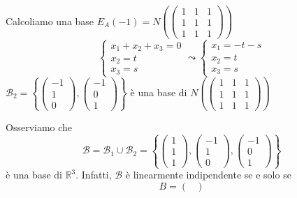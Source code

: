 \documentclass[a4paper]{article}
\theoremstyle{break}
\theoremstyle{break}
\theoremstyle{break}
\theoremstyle{break}
\begin{document}
\begin{example}
\begin{enumerate}
      \vspace{1em}
      \noindent Calcoliamo una base \( E_A(-1) = N \left( \begin{pmatrix} 
        1 & 1 & 1\\
        1 & 1 & 1\\
        1 & 1 & 1
      \end{pmatrix}  \right)  \) 
      \[
      \begin{cases}
        x_1 + x_2 + x_3 = 0\\
        x_2 = t\\
        x_3 = s
      \end{cases}
      \leadsto
      \begin{cases}
        x_1 = -t - s\\
        x_2 = t\\
        x_3 = s
      \end{cases}
      \] 
      \( \mathcal{B}_2 = \left\{ \begin{pmatrix} -1\\1\\0 \end{pmatrix},
      \begin{pmatrix} -1\\0\\1 \end{pmatrix}  \right\}  \) è una base di
      \( N \left( \begin{pmatrix} 
        1 & 1 & 1\\
        1 & 1 & 1\\
        1 & 1 & 1
      \end{pmatrix}  \right)  \)
  \end{enumerate}
  Osserviamo che \[ \mathcal{B} = \mathcal{B}_1 \cup \mathcal{B}_2 = 
    \left\{ \begin{pmatrix} 1\\1\\1 \end{pmatrix},
    \begin{pmatrix} -1\\1\\0 \end{pmatrix},
    \begin{pmatrix} -1\\0\\1 \end{pmatrix}  \right\}  \]
    è una base di \( \mathbb{R}^3 \). Infatti, \( \mathcal{B} \) è linearmente indipendente
    se e solo se
    \[
    B = \begin{pmatrix} 

\end{pmatrix}\]
\end{example}
\end{document}
